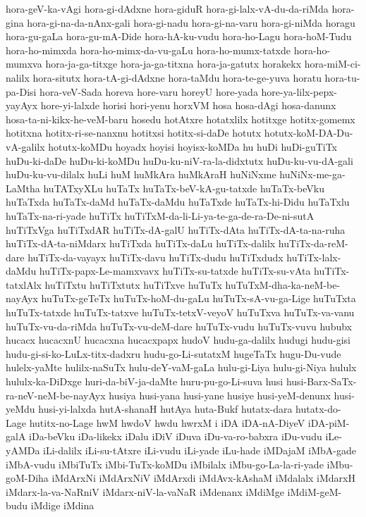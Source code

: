 {hora-geV-ka-vAgi
hora-gi-dAdxne
hora-giduR
hora-gi-lalx-vA-du-da-riMda
hora-gina
hora-gi-na-da-nAnx-gali
hora-gi-nadu
hora-gi-na-varu
hora-gi-niMda
horagu
hora-gu-gaLa
hora-gu-mA-Dide
hora-hA-ku-vudu
hora-ho-Lagu
hora-hoM-Tudu
hora-ho-mimxda
hora-ho-mimx-da-vu-gaLu
hora-ho-mumx-tatxde
hora-ho-mumxva
hora-ja-ga-titxge
hora-ja-ga-titxna
hora-ja-gatutx
horakekx
hora-miM-ci-nalilx
hora-situtx
hora-tA-gi-dAdxne
hora-taMdu
hora-te-ge-yuva
horatu
hora-tu-pa-Disi
hora-veV-Sada
horeva
hore-varu
horeyU
hore-yada
hore-ya-lilx-pepx-yayAyx
hore-yi-lalxde
horisi
hori-yenu
horxVM
hosa
hosa-dAgi
hosa-danunx
hosa-ta-ni-kikx-he-veM-baru
hosedu
hotAtxre
hotatxlilx
hotitxge
hotitx-gomemx
hotitxna
hotitx-ri-se-nanxnu
hotitxsi
hotitx-si-daDe
hotutx
hotutx-koM-DA-Du-vA-galilx
hotutx-koMDu
hoyadx
hoyisi
hoyisx-koMDa
hu
huDi
huDi-guTiTx
huDu-ki-daDe
huDu-ki-koMDu
huDu-ku-niV-ra-la-didxtutx
huDu-ku-vu-dA-gali
huDu-ku-vu-dilalx
huLi
huM
huMkAra
huMkAraH
huNiNxme
huNiNx-me-ga-LaMtha
huTATxyXLu
huTaTx
huTaTx-beV-kA-gu-tatxde
huTaTx-beVku
huTaTxda
huTaTx-daMd
huTaTx-daMdu
huTaTxde
huTaTx-hi-Didu
huTaTxlu
huTaTx-na-ri-yade
huTiTx
huTiTxM-da-li-Li-ya-te-ga-de-ra-De-ni-sutA
huTiTxVga
huTiTxdAR
huTiTx-dA-galU
huTiTx-dAta
huTiTx-dA-ta-na-ruha
huTiTx-dA-ta-niMdarx
huTiTxda
huTiTx-daLu
huTiTx-dalilx
huTiTx-da-reM-dare
huTiTx-da-vayayx
huTiTx-davu
huTiTx-dudu
huTiTxdudx
huTiTx-lalx-daMdu
huTiTx-papx-Le-mamxvavx
huTiTx-su-tatxde
huTiTx-su-vAta
huTiTx-tatxlAlx
huTiTxtu
huTiTxtutx
huTiTxve
huTuTx
huTuTxM-dha-ka-neM-be-nayAyx
huTuTx-geTeTx
huTuTx-hoM-du-gaLu
huTuTx-sA-vu-ga-Lige
huTuTxta
huTuTx-tatxde
huTuTx-tatxve
huTuTx-tetxV-veyoV
huTuTxva
huTuTx-va-vanu
huTuTx-vu-da-riMda
huTuTx-vu-deM-dare
huTuTx-vudu
huTuTx-vuvu
hububx
hucacx
hucacxnU
hucacxna
hucacxpapx
hudoV
hudu-ga-dalilx
hudugi
hudu-gisi
hudu-gi-si-ko-LuLx-titx-dadxru
hudu-go-Li-sutatxM
hugeTaTx
hugu-Du-vude
hulelx-yaMte
hulilx-naSuTx
hulu-deY-vaM-gaLa
hulu-gi-Liya
hulu-gi-Niya
hululx
hululx-ka-DiDxge
huri-da-biV-ja-daMte
huru-pu-go-Li-suva
husi
husi-Barx-SaTx-ra-neV-neM-be-nayAyx
husiya
husi-yana
husi-yane
husiye
husi-yeM-denunx
husi-yeMdu
husi-yi-lalxda
hutA-shanaH
hutAya
huta-Bukf
hutatx-dara
hutatx-do-Lage
hutitx-no-Lage
hwM
hwdoV
hwdu
hwrxM
i
iDA
iDA-nA-DiyeV
iDA-piM-galA
iDa-beVku
iDa-likekx
iDalu
iDiV
iDuva
iDu-va-ro-babxra
iDu-vudu
iLe-yAMDa
iLi-dalilx
iLi-su-tAtxre
iLi-vudu
iLi-yade
iLu-hade
iMDajaM
iMbA-gade
iMbA-vudu
iMbiTuTx
iMbi-TuTx-koMDu
iMbilalx
iMbu-go-La-la-ri-yade
iMbu-goM-Diha
iMdArxNi
iMdArxNiV
iMdArxdi
iMdAvx-kAshaM
iMdalalx
iMdarxH
iMdarx-la-va-NaRniV
iMdarx-niV-la-vaNaR
iMdenanx
iMdiMge
iMdiM-geM-budu
iMdige
iMdina
}
